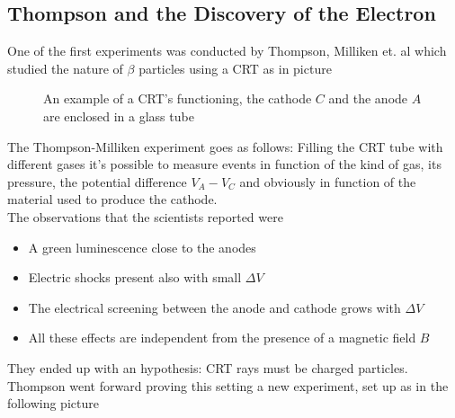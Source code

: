 \documentclass[../qm.tex]{subfiles}
\begin{document}
\subsection{Thompson and the Discovery of the Electron}
One of the first experiments was conducted by Thompson, Milliken et. al which studied the nature of $\beta$ particles using a CRT as in picture
\begin{figure}[H]
	\centering
	\caption{An example of a CRT's functioning, the cathode $C$ and the anode $A$ are enclosed in a glass tube}
	\label{fig:crt}
\end{figure}
The Thompson-Milliken experiment goes as follows: Filling the CRT tube with different gases it's possible to measure events in function of the kind of gas, its pressure, the potential difference $V_A-V_C$ and obviously in function of the material used to produce the cathode.\\
The observations that the scientists reported were
\begin{itemize}
\item A green luminescence close to the anodes
\item Electric shocks present also with small $\Delta V$
\item The electrical screening between the anode and cathode grows with $\Delta V$
\item All these effects are independent from the presence of a magnetic field $B$
\end{itemize}
They ended up with an hypothesis: CRT rays must be charged particles.\\
Thompson went forward proving this setting a new experiment, set up as in the following picture
\end{document}
